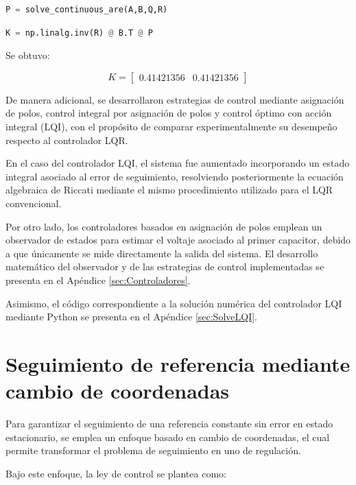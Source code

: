\documentclass[12pt,letterpaper,twoside]{article}
\begin{document}
\begin{lstlisting}[language=Python, caption={Cálculo de la ganancia LQR}, firstnumber=25]
P = solve_continuous_are(A,B,Q,R)
\end{lstlisting}

\begin{lstlisting}[language=Python, caption={Cálculo de la ganancia LQR (continuación)}, firstnumber=30]
K = np.linalg.inv(R) @ B.T @ P
\end{lstlisting}

Se obtuvo:

\[
K = \begin{bmatrix} 0.41421356 & 0.41421356 \end{bmatrix}
\]

De manera adicional, se desarrollaron estrategias de control mediante asignación de polos, control integral por asignación de polos y control óptimo con acción integral (LQI), con el propósito de comparar experimentalmente su desempeño respecto al controlador LQR.

En el caso del controlador LQI, el sistema fue aumentado incorporando un estado integral asociado al error de seguimiento, resolviendo posteriormente la ecuación algebraica de Riccati mediante el mismo procedimiento utilizado para el LQR convencional.

Por otro lado, los controladores basados en asignación de polos emplean un observador de estados para estimar el voltaje asociado al primer capacitor, debido a que únicamente se mide directamente la salida del sistema. El desarrollo matemático del observador y de las estrategias de control implementadas se presenta en el Apéndice \ref{sec:Controladores}.

Asimismo, el código correspondiente a la solución numérica del controlador LQI mediante Python se presenta en el Apéndice \ref{sec:SolveLQI}.

\section{Seguimiento de referencia mediante cambio de coordenadas}

Para garantizar el seguimiento de una referencia constante sin error en estado estacionario, se emplea un enfoque basado en cambio de coordenadas, el cual permite transformar el problema de seguimiento en uno de regulación. 

Bajo este enfoque, la ley de control se plantea como:
\end{document}
